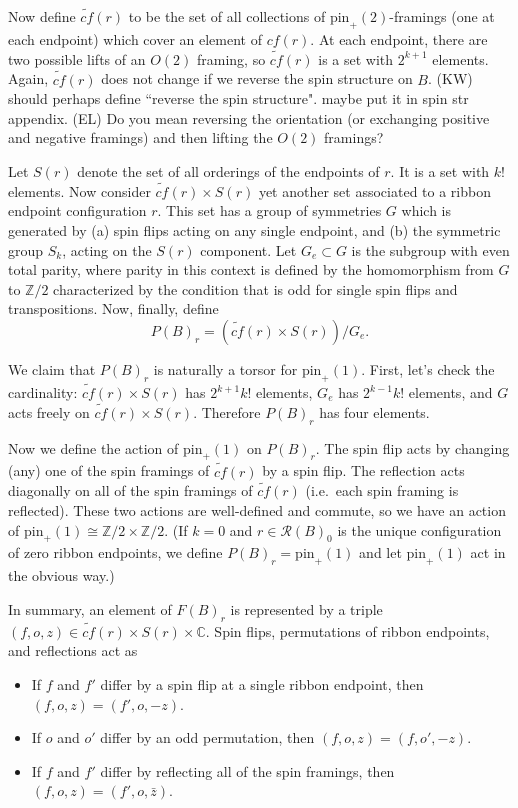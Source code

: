 \documentclass[12pt,a4paper]{article}
\newcommand{\zz}{\mathbb{Z}}
\newcommand{\cc}{\mathbb{C}}
\newcommand{\mcr}{\mathcal{R}}
\newcommand\be            {\begin{equation}}
\newcommand\ee            {\end{equation}}
\newcommand{\pin}{\text{pin}}
\newcommand{\kw}[1]{{\color{kwcolor}\footnotesize{(KW) #1}}}
\newcommand{\ethan}[1]{{\color{amethyst}\footnotesize{(EL) #1}}}
\begin{document}
\newcommand{\tcf}{\widetilde{cf}}

Now define $\tcf(r)$ to be the set of all collections of $\pin_+(2)$-framings (one at each endpoint)
which cover an element of $cf(r)$.
At each endpoint, there are two possible lifts of an $O(2)$ framing, 
so $\tcf(r)$ is a set with $2^{k+1}$ elements.
Again, $\tcf(r)$ does not change if we reverse the spin structure on $B$.
\kw{should perhaps define ``reverse the spin structure".  maybe put it in spin str appendix.}
\ethan{Do you mean reversing the orientation (or exchanging positive and negative framings) and then lifting the $O(2)$ framings?}

Let $S(r)$ denote the set of all orderings of the endpoints of $r$.
It is a set with $k!$ elements.
Now consider $\tcf(r) \times S(r)$ yet another set associated to a ribbon endpoint configuration $r$.
This set has a group of symmetries $G$ which is generated by (a) spin flips acting on any single endpoint, 
and (b) the symmetric group $S_k$, acting on the $S(r)$ component.
Let $G_e \subset G$ is the subgroup with even total parity, where 
parity in this context is defined by the homomorphism from $G$ to $\zz/2$
characterized by the condition that is odd for single spin flips and transpositions.
Now, finally, define
\be
	P(B)_r = (\tcf(r) \times S(r))/G_e .
\ee

We claim that $P(B)_r$ is naturally a torsor for $\pin_+(1)$.
First, let's check the cardinality:
$\tcf(r) \times S(r)$ has $2^{k+1} k!$ elements,
$G_e$ has $2^{k-1} k!$ elements, and $G$ acts freely on $\tcf(r) \times S(r)$.
Therefore $P(B)_r$ has four elements.

Now we define the action of $\pin_+(1)$ on $P(B)_r$.
The spin flip acts by changing (any) one of the spin framings of $\tcf(r)$ by a spin flip.
The reflection acts diagonally on all of the spin framings of $\tcf(r)$
(i.e.\ each spin framing is reflected).
These two actions are well-defined and commute, so we have
an action of $\pin_+(1) \cong \zz/2\times\zz/2$.
(If $k = 0$ and $r \in \mcr(B)_0$ is the unique configuration of zero ribbon endpoints,
we define $P(B)_r = \pin_+(1)$ and let $\pin_+(1)$ act in the obvious way.)

\medskip

In summary, an element of $F(B)_r$ is represented by a triple $(f, o, z) \in \tcf(r) \times S(r) \times \cc$.
Spin flips, permutations of ribbon endpoints, and reflections act as
\begin{itemize}
\item If $f$ and $f'$ differ by a spin flip at a single ribbon endpoint, then $(f, o, z) = (f', o, -z)$.
\item If $o$ and $o'$ differ by an odd permutation, then $(f, o, z) = (f, o', -z)$.
\item If $f$ and $f'$ differ by reflecting all of the spin framings, then $(f, o, z) = (f', o, \bar z)$.
\end{itemize}
\end{document}

